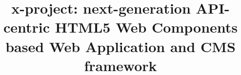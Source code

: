\documentclass{sig-alternate}
\begin{document}
%

\title{x-project: next-generation API-centric HTML5 Web Components based Web Application and CMS framework}

%
%
%
%
%
\end{document}

